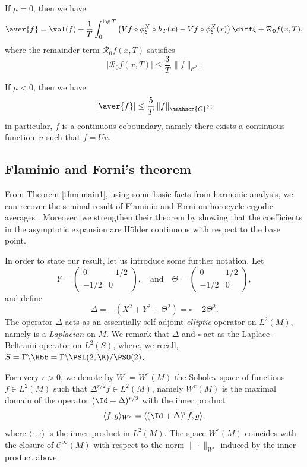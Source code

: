 \begin{theorem}
\begin{enumeratei}
\item\label{thm:main1iv}
If $\mu = 0$, then we have
\[
\aver{f} = \vol(f) + \frac{1}{T} \int_0^{\log T} \left(Vf \circ \phi^X_\xi \circ h_T(x) - Vf\circ \phi^X_\xi (x) \right) \diff \xi + \mathcal{R}_{0}f(x,T),
\]
where the remainder term $\mathcal{R}_{0}f(x,T)$ satisfies
\[
|\mathcal{R}_{0}f(x,T)|\leq \frac{3}{T}\, \|f\|_{\mathscr{C}^2}.
\]

\item\label{thm:main1v}
If $\mu < 0$, then we have
\[
|\aver{f} |\leq \frac{5}{T}\, \|f\|_{\mathscr{C}^2};
\]
in particular, $f$ is a continuous coboundary, namely there exists a continuous function~$u$ such that $f=Uu$.
\end{enumeratei}
\end{theorem}

\subsection{Flaminio and Forni's theorem}

From Theorem \ref{thm:main1}, using some basic facts from harmonic analysis, we can recover the seminal result of Flaminio and Forni on horocycle ergodic averages \cite[Th.\,1.5]{FlaFo}.
Moreover, we strengthen their theorem by showing that the coefficients in the asymptotic expansion are Hölder continuous with respect to the base point.

In order to state our result, let us introduce some further notation.
Let
\[
Y =
\begin{pmatrix}
0 & -1/2 \\
-1/2 & 0
\end{pmatrix},
\ \ \ \text{ and }\ \ \
\Theta =
\begin{pmatrix}
0 & 1/2 \\
-1/2 & 0
\end{pmatrix},
\]
and define
\[
\Delta = -(X^2 + Y^2 + \Theta^2) = \square - 2 \Theta^2.
\]
The operator $\Delta$ acts as an essentially self-adjoint \emph{elliptic} operator on $L^2(M)$, namely is a \emph{Laplacian} on $M$.
We remark that $\Delta$ and $\square$ act as the Laplace-Beltrami operator on $L^2(S)$, where, we recall, $S = \Gamma \backslash \Hbb = \Gamma \backslash \PSL(2,\R) / \PSO(2)$.

For every $r >0$, we denote by $W^r=W^r(M)$ the Sobolev space of functions $f \in L^2(M)$ such that $\Delta^{r/2}f \in L^2(M)$, namely $W^r(M)$ is the maximal domain of the operator $(\Id + \Delta)^{r/2}$ with the inner product
\begin{equation}\label{eq:def_inn_prod_Wr}
\langle f,g \rangle_{W^r} = \langle (\Id + \Delta)^rf,g \rangle,
\end{equation}
where $\langle \cdot\,, \cdot \rangle$ is the inner product in $L^2(M)$.
The space $W^r(M)$ coincides with the closure of $\mathscr{C}^\infty(M)$ with respect to the norm $\|{\cdot} \|_{W^r}$ induced by the inner product above.

